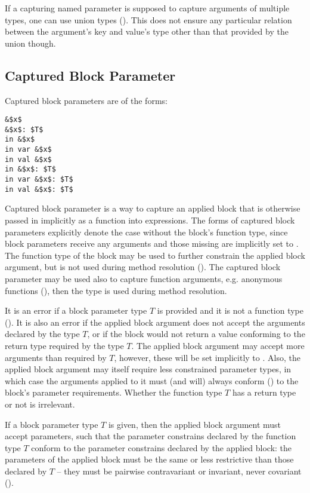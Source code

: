 If a capturing named parameter is supposed to capture arguments of multiple types, one can use union types (). This does not ensure any particular relation between the argument's key and value's type other than that provided by the union though.






\subsection{Captured Block Parameter}
\label{sec:captured-block-parameter}

Captured block parameters are of the forms:
\begin{lstlisting}
&$x$
&$x$: $T$
in &$x$
in var &$x$
in val &$x$
in &$x$: $T$
in var &$x$: $T$
in val &$x$: $T$
\end{lstlisting}

Captured block parameter is a way to capture an applied block that is otherwise passed in implicitly as a function into  expressions. The forms of captured block parameters explicitly denote the case without the block's function type, since block parameters receive any arguments and those missing are implicitly set to . The function type of the block may be used to further constrain the applied block argument, but is not used during method resolution (). The captured block parameter may be used also to capture function arguments, e.g. anonymous functions (), then the type is used during method resolution. 

It is an error if a block parameter type $T$ is provided and it is not a function type (). It is also an error if the applied block argument does not accept the arguments declared by the type $T$, or if the block would not return a value conforming to the return type required by the type $T$. The applied block argument may accept more arguments than required by $T$, however, these will be set implicitly to . Also, the applied block argument may itself require less constrained parameter types, in which case the arguments applied to it must (and will) always conform () to the block's parameter requirements. Whether the function type $T$ has a return type or not is irrelevant. 

If a block parameter type $T$ is given, then the applied block argument must accept parameters, such that the parameter constrains declared by the function type $T$ conform to the parameter constrains declared by the applied block: the parameters of the applied block must be the same or less restrictive than those declared by $T$ -- they must be pairwise contravariant or invariant, never covariant (). 

